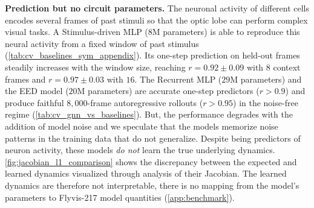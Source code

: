 \documentclass{article}
\def\stimbase{Stimulus-driven MLP}
\def\eedbase{EED model}
\def\mlpbase{Recurrent MLP}
\begin{document}
\textbf{Prediction but no circuit parameters.}
The neuronal activity of different cells encodes several frames of past
stimuli so that the optic lobe can perform complex visual tasks. A
\stimbase{} ($8$M parameters) is able to reproduce this neural activity from a fixed window of past stimulus (\cref{tab:cv_baselines_sym_appendix}). Its one-step prediction on held-out frames
steadily increases with the window size, reaching $r = 0.92 \pm 0.09$
with $8$ context frames and $r = 0.97 \pm 0.03$ with $16$.
The \mlpbase{} ($29$M parameters) and the \eedbase{} ($20$M parameters) are
accurate one-step predictors ($r > 0.9$) and produce
faithful $8{,}000$-frame autoregressive rollouts ($r > 0.95$) in the noise-free
regime (\cref{tab:cv_gnn_vs_baselines}). But, the performance degrades with the addition of model noise and we speculate that the models memorize noise patterns in the training data that do not generalize. Despite being predictors of neuron activity, these models \emph{do not} learn the true underlying dynamics. \cref{fig:jacobian_l1_comparison} shows the discrepancy between the expected and learned dynamics visualized through analysis of their Jacobian. 
The learned dynamics are therefore not interpretable, there is no
mapping from the model's parameters to Flyvis-217 model quantities (\cref{app:benchmark}).


\end{document}

